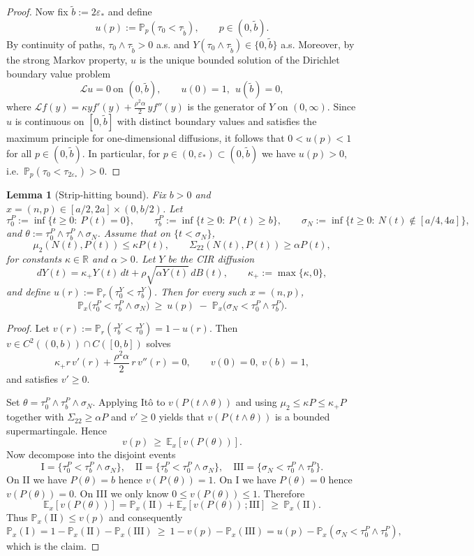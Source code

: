 \documentclass[pdflatex,sn-mathphys-ay]{sn-jnl}
\theoremstyle{thmstyleone}
\newtheorem{lemma}[theorem]{Lemma}
\theoremstyle{definition}
\theoremstyle{remark}
\begin{document}
\begin{appendices}
\begin{proof}
Now fix $\tilde b:=2\varepsilon_*$ and define
\[
u(p):=\mathbb P_p(\tau_0<\tau_{\tilde b}),\qquad p\in(0,\tilde b).
\]
By continuity of paths, $\tau_0\wedge\tau_{\tilde b}>0$ a.s. and $Y(\tau_0\wedge\tau_{\tilde b})\in\{0,\tilde b\}$ a.s. Moreover, by the strong
Markov property, $u$ is the unique bounded solution of the Dirichlet boundary value problem
\[
\mathcal L u=0\ \text{on }(0,\tilde b),\qquad u(0)=1,\ \ u(\tilde b)=0,
\]
where $\mathcal L f(y)=\kappa y f'(y)+\frac{\rho^2\alpha}{2}\,y f''(y)$ is the generator of $Y$ on $(0,\infty)$.
Since $u$ is continuous on $[0,\tilde b]$ with distinct boundary values and satisfies the maximum principle for
one-dimensional diffusions, it follows that $0<u(p)<1$ for all $p\in(0,\tilde b)$.
In particular, for $p\in(0,\varepsilon_*)\subset(0,\tilde b)$ we have $u(p)>0$, i.e.\ $\mathbb P_p(\tau_0<\tau_{2\varepsilon_*})>0$.
\end{proof}

\begin{lemma}[Strip-hitting bound]\label{lem:strip_hit_with_sigma}
Fix $b>0$ and $x=(n,p)\in [a/2,2a]\times(0,b/2)$. Let
\[
\tau_0^P:=\inf\{t\ge0:\ P(t)=0\},\qquad
\tau_b^P:=\inf\{t\ge0:\ P(t)\ge b\},\qquad
\sigma_N:=\inf\{t\ge0:\ N(t)\notin[a/4,4a]\},
\]
and $\theta:=\tau_0^P\wedge\tau_b^P\wedge\sigma_N$.
Assume that on $\{t<\sigma_N\}$,
\[
\mu_2(N(t),P(t))\le \kappa P(t),\qquad \Sigma_{22}(N(t),P(t))\ge \alpha P(t),
\]
for constants $\kappa\in\mathbb R$ and $\alpha>0$. Let $Y$ be the CIR diffusion
\[
dY(t)=\kappa_+Y(t)\,dt+\rho\sqrt{\alpha Y(t)}\,dB(t),\qquad \kappa_+:=\max\{\kappa,0\},
\]
and define $u(r):=\mathbb P_r(\tau_0^Y<\tau_b^Y)$.
Then for every such $x=(n,p)$,
\[
\mathbb P_x\bigl(\tau_0^P<\tau_b^P\wedge\sigma_N\bigr)
\ \ge\
u(p)\;-\;\mathbb P_x\bigl(\sigma_N<\tau_0^P\wedge\tau_b^P\bigr).
\]
\end{lemma}

\begin{proof}
Let $v(r):=\mathbb P_r(\tau_b^Y<\tau_0^Y)=1-u(r)$. Then $v\in C^2((0,b))\cap C([0,b])$ solves
\[
\kappa_+ r\,v'(r)+\frac{\rho^2\alpha}{2}\,r\,v''(r)=0,\qquad v(0)=0,\ v(b)=1,
\]
and satisfies $v'\ge0$.

Set $\theta=\tau_0^P\wedge\tau_b^P\wedge\sigma_N$. Applying It\^o to $v(P(t\wedge\theta))$ and using
$\mu_2\le \kappa P\le \kappa_+P$ together with $\Sigma_{22}\ge \alpha P$ and $v'\ge0$ yields that
$v(P(t\wedge\theta))$ is a bounded supermartingale. Hence
\[
v(p)\ \ge\ \mathbb E_x[v(P(\theta))].
\]
Now decompose into the disjoint events
\[
\text{I}=\{\tau_0^P<\tau_b^P\wedge\sigma_N\},\quad
\text{II}=\{\tau_b^P<\tau_0^P\wedge\sigma_N\},\quad
\text{III}=\{\sigma_N<\tau_0^P\wedge\tau_b^P\}.
\]
On II we have $P(\theta)=b$ hence $v(P(\theta))=1$. On I we have $P(\theta)=0$ hence $v(P(\theta))=0$.
On III we only know $0\le v(P(\theta))\le 1$. Therefore
\[
\mathbb E_x[v(P(\theta))]
=
\mathbb P_x(\text{II})+\mathbb E_x\!\left[v(P(\theta))\,;\text{III}\right]
\ \ge\ \mathbb P_x(\text{II}).
\]
Thus $\mathbb P_x(\text{II})\le v(p)$ and consequently
\[
\mathbb P_x(\text{I})
=
1-\mathbb P_x(\text{II})-\mathbb P_x(\text{III})
\ \ge\
1-v(p)-\mathbb P_x(\text{III})
=
u(p)-\mathbb P_x(\sigma_N<\tau_0^P\wedge\tau_b^P),
\]
which is the claim.
\end{proof}


\end{appendices}
\end{document}
